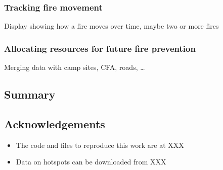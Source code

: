 \hypertarget{tracking-fire-movement}{%
\subsubsection{Tracking fire movement}\label{tracking-fire-movement}}

Display showing how a fire moves over time, maybe two or more fires

\hypertarget{allocating-resources-for-future-fire-prevention}{%
\subsubsection{Allocating resources for future fire
prevention}\label{allocating-resources-for-future-fire-prevention}}

Merging data with camp sites, CFA, roads, \ldots{}

\hypertarget{summary}{%
\subsection{Summary}\label{summary}}

\hypertarget{acknowledgements}{%
\subsection{Acknowledgements}\label{acknowledgements}}

\begin{itemize}
\tightlist
\item
  The code and files to reproduce this work are at XXX
\item
  Data on hotspots can be downloaded from XXX
\end{itemize}




\address{%
Weihao Li\\
Monash University\\%
line 1\\ line 2\\
%
%
%
\\\href{mailto:wlii0039@student.monash.edu}{\nolinkurl{wlii0039@student.monash.edu}}
}

\address{%
Emily Dodwell\\
AT\&T\\%
line 1\\ line 2\\
%
%
%
\\\href{mailto:emily@research.att.com}{\nolinkurl{emily@research.att.com}}
}

\address{%
Dianne Cook\\
Monash University\\%
line 1\\ line 2\\
%
%
%
\\\href{mailto:dicook@monash.edu}{\nolinkurl{dicook@monash.edu}}
}

